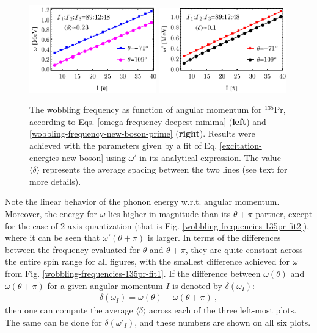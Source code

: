 \begin{figure}
    \centering
    \includegraphics[width=0.49\textwidth]{Chapters/Figures/omega-fit-3.pdf}
    \includegraphics[width=0.49\textwidth]{Chapters/Figures/omega-prime-fit-3.pdf}
    \caption{The wobbling frequency as function of angular momentum for $^{135}$Pr, according to Eqs. \ref{omega-frequency-deepest-minima} (\textbf{left}) and \ref{wobbling-frequency-new-boson-prime} (\textbf{right}). Results were achieved with the parameters given by a fit of Eq. \ref{excitation-energies-new-boson} using $\omega'$ in its analytical expression. The value $\langle\delta\rangle$ represents the average spacing between the two lines (see text for more details).}
    \label{wobbling-frequencies-135pr-fit3}
\end{figure}

Note the linear behavior of the phonon energy w.r.t. angular momentum. Moreover, the energy for $\omega$ lies higher in magnitude than its $\theta+\pi$ partner, except for the case of $2$-axis quantization (that is Fig. \ref{wobbling-frequencies-135pr-fit2}), where it can be seen that $\omega'(\theta+\pi)$ is larger. In terms of the differences between the frequency evaluated for $\theta$ and $\theta+\pi$, they are quite constant across the entire spin range for all figures, with the smallest difference achieved for $\omega$ from Fig. \ref{wobbling-frequencies-135pr-fit1}. If the difference between $\omega(\theta)$ and $\omega(\theta+\pi)$ for a given angular momentum $I$ is denoted by $\delta(\omega_I)$:
\begin{align}
\delta(\omega_I)=\omega(\theta)-\omega(\theta+\pi)\ ,    
\end{align}
then one can compute the average $\langle\delta\rangle$ across each of the three left-most plots. The same can be done for $\delta(\omega'_I)$, and these numbers are shown on all six plots.

